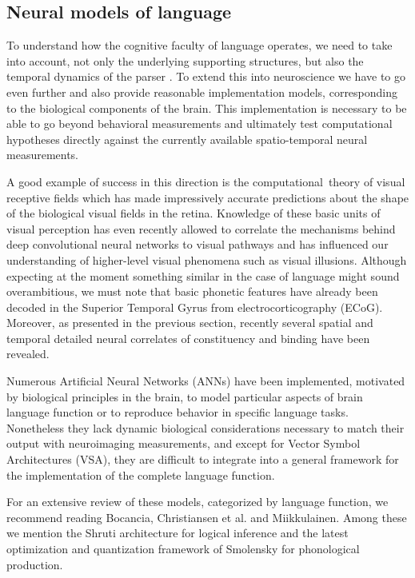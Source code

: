 \documentclass[10pt]{article}
\begin{document}
\subsection{Neural models of language}

{\label{619233}}

To understand how the cognitive faculty of language operates, we need to take into account, not only the underlying supporting structures, but also the temporal dynamics of the parser \cite{hale2014automaton}.
To extend this into neuroscience we have to go even further and also provide reasonable implementation models, corresponding to the biological components of the brain.
This implementation is necessary to be able to go beyond behavioral measurements and ultimately test computational hypotheses directly against the currently available spatio-temporal neural measurements.

A good example of success in this direction is the computational~theory of visual receptive fields\cite{lindeberg2017normative} which has made impressively accurate predictions about the shape of the biological visual fields in the retina.
Knowledge of these basic units of visual perception has even recently allowed to correlate the mechanisms behind deep convolutional neural networks to visual pathways\cite{Guclu_2015,Eickenberg_2017} and has influenced our understanding of higher-level visual phenomena such as visual illusions\cite{Eagleman_2001}.
Although expecting at the moment something similar in the case of language might sound overambitious, we must note that basic phonetic features have already been decoded in the  Superior Temporal Gyrus from electrocorticography (ECoG)\cite{Mesgarani_2014}.
Moreover, as presented in the previous section, recently several spatial and temporal detailed neural correlates of constituency and binding have been revealed.

Numerous Artificial Neural Networks (ANNs) have been implemented, motivated by biological principles in the brain, to model particular aspects of brain language function or to reproduce behavior in specific language tasks.
Nonetheless they lack dynamic biological considerations necessary to match their output with neuroimaging measurements, and except for Vector Symbol Architectures (VSA)\cite{smolensky2006harmonic}, they are difficult to integrate into a general framework for the implementation of the complete language function.

For an extensive review of these models, categorized by language function, we recommend reading Bocancia\cite{bocancia2014psycholinguistically}, 
Christiansen et al.\cite{Christiansen_1999} and Miikkulainen\cite{miikkulainen1997natural}.
Among these we mention the Shruti architecture for logical inference\cite{Wendelken_2004} and the latest optimization and quantization framework of Smolensky for phonological 
production\cite{Smolensky_2013}.
\end{document}
